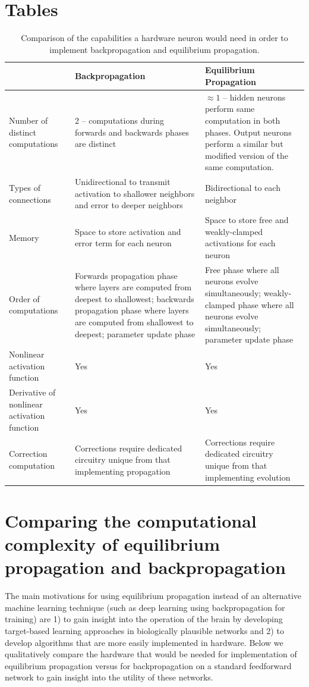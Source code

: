 \documentclass[utf8]{frontiersSCNS}
\begin{document}
\begin{appendices}
\section*{Tables}
\begin{table}[h!]
\begin{center}
\begin{tabular}{|L||L|L|}
\hline
&Backpropagation & Equilibrium Propagation \\ \hline\hline
Number of distinct computations & 2 -- computations during forwards and backwards phases are distinct & $\approx 1$ -- hidden neurons perform same computation in both phases. Output neurons perform a similar but modified version of the same computation. \\ \hline
Types of connections & Unidirectional to transmit activation to shallower neighbors and error to deeper neighbors & Bidirectional to each neighbor \\ \hline
Memory & Space to store activation and error term for each neuron & Space to store free and weakly-clamped activations for each neuron \\ \hline
Order of computations & Forwards propagation phase where layers are computed from deepest to shallowest; backwards propagation phase where layers are computed from shallowest to deepest; parameter update phase & Free phase where all neurons evolve simultaneously; weakly-clamped phase where all neurons evolve simultaneously; parameter update phase \\ \hline
Nonlinear activation function & Yes & Yes \\ \hline
Derivative of nonlinear activation function & Yes & Yes \\ \hline
Correction computation & Corrections require dedicated circuitry unique from that implementing propagation & Corrections require dedicated circuitry unique from that implementing evolution \\ \hline
\end{tabular}
\end{center}
\caption{Comparison of the capabilities a hardware neuron would need in order to implement backpropagation and equilibrium propagation.} \label{table:bp_eqp_contrast}
\end{table}

\section{Comparing the computational complexity of equilibrium propagation and backpropagation}
\label{sec:comparison}
The main motivations for using equilibrium propagation instead of an alternative 
machine learning technique (such as deep learning using backpropagation for training) are 1) to 
gain insight into the operation of the brain by developing target-based learning approaches in 
biologically plausible networks and 2) to develop algorithms that are more easily implemented in 
hardware. Below we qualitatively compare the hardware that would be needed for implementation of 
equilibrium propagation versus for backpropagation on a standard feedforward network to gain 
insight into the utility of these networks.


\end{appendices}
\end{document}
